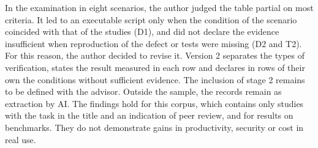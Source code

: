 In the examination in eight scenarios, the author judged the table partial on most criteria. It led to an executable
script only when the condition of the scenario coincided with that of the studies (D1), and did not declare the evidence
insufficient when reproduction of the defect or tests were missing (D2 and T2). For this reason, the author decided to revise it. Version 2
separates the types of verification, states the result measured in each row and declares in rows of their own the
conditions without sufficient evidence. The inclusion of stage 2 remains to be defined with the advisor.
Outside the sample, the records remain as extraction by AI. The
findings hold for this corpus, which contains only studies with the task in the title and an indication of peer review, and for
results on benchmarks. They do not demonstrate gains in productivity, security or cost in real use.
